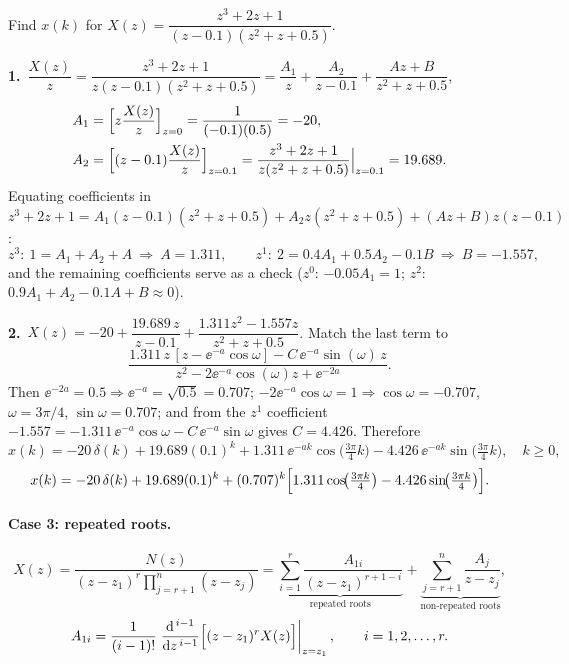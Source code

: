 \begin{example}
Find $x(k)$ for $X(z)=\dfrac{z^{3}+2z+1}{(z-0.1)(z^{2}+z+0.5)}$.

\medskip\noindent\textbf{1.}\
$\dfrac{X(z)}{z}=\dfrac{z^{3}+2z+1}{z(z-0.1)(z^{2}+z+0.5)}=\dfrac{A_1}{z}+\dfrac{A_2}{z-0.1}+\dfrac{Az+B}{z^{2}+z+0.5}$,
\begin{align*}
  A_1&=\Bigl[z\frac{X(z)}{z}\Bigr]_{z=0}=\frac{1}{(-0.1)(0.5)}=-20,\\
  A_2&=\Bigl[(z-0.1)\frac{X(z)}{z}\Bigr]_{z=0.1}=\frac{z^{3}+2z+1}{z(z^{2}+z+0.5)}\Big|_{z=0.1}=19.689 .
\end{align*}
Equating coefficients in
$z^{3}+2z+1=A_1(z-0.1)(z^{2}+z+0.5)+A_2z(z^{2}+z+0.5)+(Az+B)z(z-0.1)$:
\[
  z^{3}:\ 1=A_1+A_2+A\ \Rightarrow\ A=1.311,\qquad
  z^{1}:\ 2=0.4A_1+0.5A_2-0.1B\ \Rightarrow\ B=-1.557,
\]
and the remaining coefficients serve as a check ($z^{0}$: $-0.05A_1=1$; $z^{2}$: $0.9A_1+A_2-0.1A+B\approx0$).

\smallskip\noindent\textbf{2.}\
$X(z)=-20+\dfrac{19.689\,z}{z-0.1}+\dfrac{1.311z^{2}-1.557z}{z^{2}+z+0.5}$. Match the last term to
\[
  \frac{1.311\,z\,[z-\ee^{-a}\cos\omega]-C\,\ee^{-a}\sin(\omega)\,z}{z^{2}-2\ee^{-a}\cos(\omega)z+\ee^{-2a}} .
\]
Then $\ee^{-2a}=0.5\Rightarrow\ee^{-a}=\sqrt{0.5}=0.707$; $-2\ee^{-a}\cos\omega=1\Rightarrow\cos\omega=-0.707$,
$\omega=3\pi/4$, $\sin\omega=0.707$; and from the $z^{1}$ coefficient $-1.557=-1.311\,\ee^{-a}\cos\omega-C\,\ee^{-a}\sin\omega$
gives $C=4.426$. Therefore
\[
  x(k)=-20\,\delta(k)+19.689(0.1)^{k}+1.311\,\ee^{-ak}\cos\!\bigl(\tfrac{3\pi}{4}k\bigr)-4.426\,\ee^{-ak}\sin\!\bigl(\tfrac{3\pi}{4}k\bigr),\quad k\ge0,
\]
\[
  x(k)=-20\,\delta(k)+19.689(0.1)^{k}+(0.707)^{k}\Bigl[1.311\cos\!\bigl(\tfrac{3\pi k}{4}\bigr)-4.426\sin\!\bigl(\tfrac{3\pi k}{4}\bigr)\Bigr].
\]
\end{example}

\paragraph{Case 3: repeated roots.}
\[
  X(z)=\frac{N(z)}{(z-z_1)^{r}\prod_{j=r+1}^{n}(z-z_j)}
  =\underbrace{\sum_{i=1}^{r}\frac{A_{1i}}{(z-z_1)^{r+1-i}}}_{\text{repeated roots}}
   +\underbrace{\sum_{j=r+1}^{n}\frac{A_j}{z-z_j}}_{\text{non-repeated roots}},
\]
\[
  A_{1i}=\frac{1}{(i-1)!}\left.\frac{\mathrm{d}^{\,i-1}}{\mathrm{d} z^{\,i-1}}\Bigl[(z-z_1)^{r}X(z)\Bigr]\right|_{z=z_1},\qquad i=1,2,\dots,r.
\]

